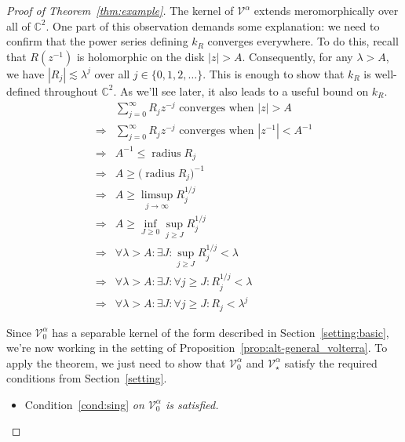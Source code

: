 \documentclass{article}
\theoremstyle{plain}
\newcommand{\C}{\mathbb{C}}
\newcommand{\volterra}{\mathcal{V}}
\newcommand{\hardpart}{\mathcal{V}_0}
\newcommand{\softpart}{\mathcal{V}_\star}
\newenvironment{verify}{\color{ForestGreen}}{\color{black}}
\begin{document}
\begin{proof}[Proof of Theorem~\ref{thm:example}]
The kernel of $\volterra^\alpha$ extends meromorphically over all of $\C^2$. One part of this observation demands some explanation: we need to confirm that the power series defining $k_R$ converges everywhere. To do this, recall that $R(z^{-1})$ is holomorphic on the disk $|z| > A$. Consequently, for any $\lambda > A$, we have $|R_{j}| \lesssim \lambda^j$ over all $j \in \{0, 1, 2, \ldots\}$. This is enough to show that $k_R$ is well-defined throughout $\C^2$. As we'll see later, it also leads to a useful bound on $k_R$.
\begin{verify}
\begin{align*}
& \sum_{j = 0}^\infty R_j z^{-j} \text{ converges when } |z| > A \\
\Longrightarrow & \sum_{j = 0}^\infty R_j z^{-j} \text{ converges when } |z^{-1}| < A^{-1} \\
\Longrightarrow & A^{-1} \le \operatorname{radius} R_j \\
\Longrightarrow & A \ge \big(\operatorname{radius} R_j\big)^{-1} \\
\Longrightarrow & A \ge \limsup_{j \to \infty} R_j^{1/j} \\
\Longrightarrow & A \ge \inf_{J \ge 0} \sup_{j \ge J} R_j^{1/j} \\
\Longrightarrow & \forall \lambda > A: \exists J: \sup_{j \ge J} R_j^{1/j} < \lambda \\
\Longrightarrow & \forall \lambda > A: \exists J: \forall j \ge J: R_j^{1/j} < \lambda \\
\Longrightarrow & \forall \lambda > A: \exists J: \forall j \ge J: R_j < \lambda^j
\end{align*}
\end{verify}

Since $\hardpart^\alpha$ has a separable kernel of the form described in Section~\ref{setting:basic}, we're now working in the setting of Proposition~\ref{prop:alt-general_volterra}. To apply the theorem, we just need to show that $\hardpart^\alpha$ and $\softpart^\alpha$ satisfy the required conditions from Section~\ref{setting}.
\begin{itemize}
\item Condition~\eqref{cond:sing} {\em on $\hardpart^\alpha$ is satisfied.}


\end{itemize}
\end{proof}
\end{document}
